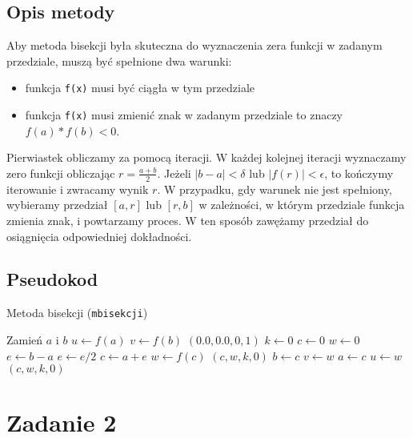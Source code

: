 \documentclass{article}
\begin{document}
\subsection*{Opis metody}
Aby metoda bisekcji była skuteczna do wyznaczenia zera funkcji w zadanym przedziale, muszą być spełnione dwa warunki: 
\begin{itemize}
    \item funkcja \texttt{f(x)} musi być ciągła w tym przedziale
    \item funkcja \texttt{f(x)} musi zmienić znak w zadanym przedziale to znaczy $f(a)*f(b)<0$. 
\end{itemize}

Pierwiastek obliczamy za pomocą iteracji. W każdej kolejnej iteracji wyznaczamy zero funkcji obliczając $r=\frac{a+b}{2}$. Jeżeli $|b-a|<\delta$ lub $|f(r)|<\epsilon$, to kończymy iterowanie i zwracamy wynik $r$.  W przypadku, gdy warunek nie jest spełniony, wybieramy przedział $[a,r]$ lub $[r,b]$ w zależności, w którym przedziale funkcja zmienia znak, i powtarzamy proces. W ten sposób zawężamy przedział do osiągnięcia odpowiedniej dokładności. 
\subsection*{Pseudokod}
\begin{algorithm}
\caption{Metoda bisekcji (\texttt{mbisekcji})}
\begin{algorithmic}[1]
        \State Zamień $a$ i $b$
    \EndIf
    \State $u \gets f(a)$
    \State $v \gets f(b)$
        \State \Return $(0.0, 0.0, 0, 1)$
    \EndIf
    \State $k \gets 0$
    \State $c \gets 0$
    \State $w \gets 0$
    \State $e \gets b - a$
        \State $e \gets e / 2$
        \State $c \gets a + e$
        \State $w \gets f(c)$
            \State \Return $(c, w, k, 0)$
        \EndIf
            \State $b \gets c$
            \State $v \gets w$
        \Else
            \State $a \gets c$
            \State $u \gets w$
        \EndIf
    \EndFor
    \State \Return $(c, w, k, 0)$
\EndFunction
\end{algorithmic}
\end{algorithm}
\section*{Zadanie 2}
\end{document}
